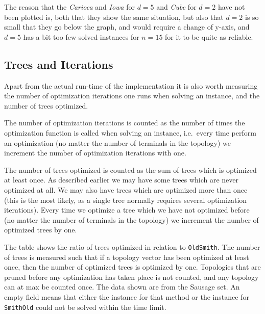 The reason that the \textit{Carioca} and \textit{Iowa} for $d=5$ and
\textit{Cube} for $d = 2$ have not been plotted is, both that they show the same
situation, but also that $d=2$ is so small that they go below the graph, and
would require a change of y-axis, and $d=5$ has a bit too few solved
instances for $n=15$ for it to be quite as reliable.

\subsection{Trees and Iterations}
\label{sec:trees-iterations}

Apart from the actual run-time of the implementation it is also worth measuring
the number of optimization iterations one runs when solving an instance, and the
number of trees optimized.

The number of optimization iterations is counted as the number of times the
optimization function is called when solving an instance, i.e.\ every time
perform an optimization (no matter the number of terminals in the topology) we
increment the number of optimization iterations with one.

The number of trees optimized is counted as the sum of trees which is optimized
at least once. As described earlier we may have some trees which are never
optimized at all. We may also have trees which are optimized more than once
(this is the most likely, as a single tree normally requires several
optimization iterations). Every time we optimize a tree which we have not
optimized before (no matter the number of terminals in the topology) we
increment the number of optimized trees by one.

\begin{table}[htbp]
  \centering
  
  \caption[Tree-exploration ratio for Sausage]{The table shows the ratio of
    trees optimized in relation to \texttt{OldSmith}. The number of trees is
    measured such that if a topology vector has been optimized at least once,
    then the number of optimized trees is optimized by one. Topologies that are
    pruned before any optimization has taken place is not counted, and any
    topology can at max be counted once. The data shown are from the Sausage
    set. An empty field means that either the instance for that method or the
    instance for \texttt{SmithOld} could not be solved within the time
    limit.\label{tab:trees-sausage-ratio}}
\end{table}

